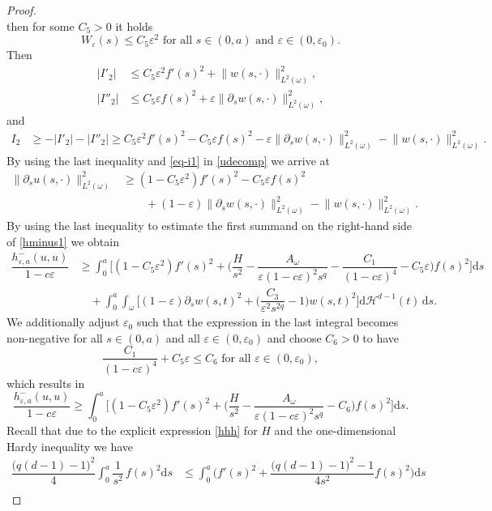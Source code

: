 \documentclass[11pt,oneside,reqno,a4paper]{amsart}
\newcommand{\dd}{\mathrm{d}}
\renewcommand{\H}{\mathcal{H}}
\newcommand{\eps}{\varepsilon}
\theoremstyle{definition}
\begin{document}
\begin{proof}
\[\]
then for some $C_5>0$ it holds
\[
W_\eps(s)\le C_5\eps^2\text{ for all $s\in(0,a)$ and $\eps\in(0,\eps_0)$.}
\]
Then
\begin{align*}
	|I'_2|&\le C_5\eps^2 f'(s)^2+\big\|w(s,\cdot)\big\|^2_{L^2(\omega)},\\
	|I''_2|&\le C_5\eps f(s)^2+\eps\big\|\partial_s w(s,\cdot)\big\|^2_{L^2(\omega)},
\end{align*}
and
\begin{align*}
	I_2&\ge -|I'_2|-|I''_2|\ge C_5\eps^2 f'(s)^2- C_5\eps f(s)^2-\eps\big\|\partial_s w(s,\cdot)\big\|^2_{L^2(\omega)}
	-\big\|w(s,\cdot)\big\|^2_{L^2(\omega)}.
\end{align*}
By using the last inequality and \eqref{eq-i1} in \eqref{udecomp} we arrive at
\begin{align*}
	\big\|\partial_s u(s,\cdot)\big\|^2_{L^2(\omega)}&\ge (1-C_5\eps^2)f'(s)^2-C_5\eps f(s)^2\\
	&\qquad +(1-\eps)\big\|\partial_s w(s,\cdot)\big\|^2_{L^2(\omega)}-\big\|w(s,\cdot)\big\|^2_{L^2(\omega)}.
\end{align*}
By using the last inequality to estimate the first summand on the right-hand side of \eqref{hminus1}
we obtain
\begin{align*}
		\dfrac{h^-_{\eps,a}(u,u)}{1-c\eps}&\ge 
		\int_0^a\bigg[(1-C_5\eps^2)f'(s)^2+\bigg(\dfrac{H}{s^2}
		-\dfrac{A_\omega}{\eps(1-c\eps)^2 s^q}-\dfrac{C_1}{(1-c\eps)^4}-C_5\eps\bigg)
		f(s)^2	\bigg]\dd s\\
		&\quad+\int_0^a\int_\omega \bigg[(1-\eps)\partial_s w(s,t)^2+\bigg(\dfrac{C_3}{\eps^2 s^{2q}}
		-1\bigg)w(s,t)^2\bigg]\dd\H^{d-1}(t)\,\dd s.
\end{align*}
We additionally adjust $\eps_0$ such that the expression in the last integral
becomes non-negative for all $s\in(0,a)$ and all $\eps\in(0,\eps_0)$ and choose $C_6>0$
to have
\[
\dfrac{C_1}{(1-c\eps)^4}+C_5\eps \le C_6 \text{ for all }\eps\in(0,\eps_0),
\]
which results in
\begin{equation}
	\label{hminus3}
	\dfrac{h^-_{\eps,a}(u,u)}{1-c\eps}\ge \int_0^a\bigg[(1-C_5\eps^2)f'(s)^2 
	+\bigg(\dfrac{H}{s^2}
	-\dfrac{A_\omega}{\eps(1-c\eps)^2 s^q}-C_6\bigg)
	f(s)^2	\bigg]\dd s.
\end{equation}
Recall that due to the explicit expression \eqref{hhh} for $H$ and the one-dimensional Hardy inequality we have
\begin{align*}
\dfrac{\big(q(d-1)-1\big)^2}{4}\int_0^a \dfrac{1}{s^2}\, f(s)^2\dd s
&\le \int_0^a \bigg(f'(s)^2+\dfrac{\big(q(d-1)-1\big)^2-1}{4 s^2}f(s)^2\bigg)\dd s\\

\end{align*}
\end{proof}
\end{document}
